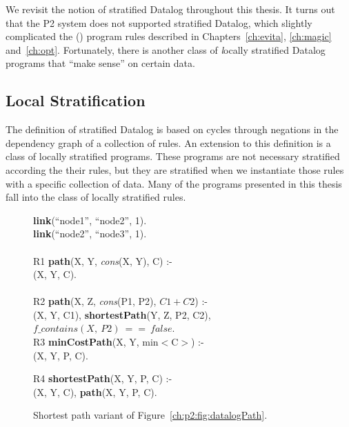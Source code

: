 We revisit the notion of stratified Datalog throughout this thesis.  It turns
out that the P2 system does not supported stratified Datalog, which slightly
complicated the (\OVERLOG) program rules described in Chapters~\ref{ch:evita},
\ref{ch:magic} and~\ref{ch:opt}.  Fortunately, there is another class of {\emph
locally stratified} Datalog programs that ``make sense'' on certain data.

\subsection{Local Stratification}

The definition of stratified Datalog is based on cycles through negations in
the dependency graph of a collection of rules.  An extension to this definition
is a class of locally stratified programs.  These programs are not necessary
stratified according the their rules, but they are stratified when we
instantiate those rules with a specific collection of data.  Many of the
programs presented in this thesis fall into the class of locally stratified
rules.

\begin{figure}
\ssp
\begin{boxedminipage}{\linewidth}
{\bf link}(``node1'', ``node2'', 1). \\
{\bf link}(``node2'', ``node3'', 1). \\
\\
R1 {\bf path}(X, Y, {\em cons}(X, Y), C) :- \\
(X, Y, C). \\
\\       
R2 {\bf path}(X, Z, {\em cons}(P1, P2), $C1+C2$) :- \\
(X, Y, C1), {\bf shortestPath}(Y, Z, P2, C2), \\
\datalogspace $f\_contains(X,\ P2)\ ==\ false$. \\ 

R3 {\bf minCostPath}(X, Y, min$<$C$>$) :-  \\
(X, Y, P, C).

R4 {\bf shortestPath}(X, Y, P, C) :- \\
(X, Y, C), {\bf path}(X, Y, P, C).\\

\end{boxedminipage}
\caption{\label{ch:p2:fig:datalogSP}Shortest path variant of Figure~\ref{ch:p2:fig:datalogPath}.}
\end{figure}

